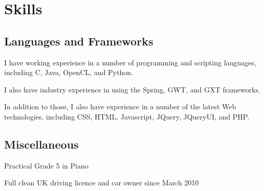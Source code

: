 \documentclass[11pt,a4paper]{article}
\begin{document}
\section*{Skills}

\subsection*{Languages and Frameworks}

I have working experience in a number of programming and scripting languages,
including C, Java, OpenCL, and Python.

I also have industry experience in using the Spring, GWT, and GXT frameworks.

In addition to those, I also have experience in a number of the latest Web
technologies, including CSS, HTML, Javascript, JQuery, JQueryUI, and PHP.

\subsection*{Miscellaneous}

Practical Grade 5 in Piano

Full clean UK driving licence and car owner since March 2010

\end{document}
